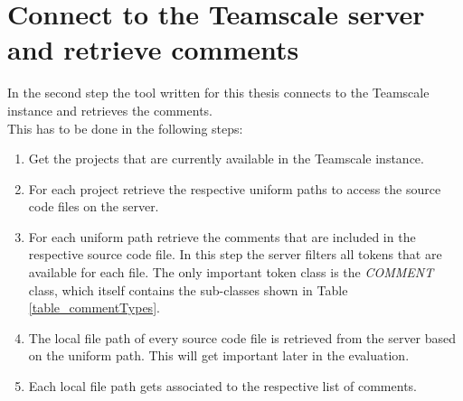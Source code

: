 \section{Connect to the Teamscale server and retrieve comments}
\label{chapter_retrieveComments}
In the second step the tool written for this thesis connects to the Teamscale instance and retrieves the comments.\\
This has to be done in the following steps:
\begin{enumerate}
	\item Get the projects that are currently available in the Teamscale instance. 
	\item For each project retrieve the respective uniform paths to access the source code files on the server.
	\item For each uniform path retrieve the comments that are included in the respective source code file. In this step the server filters all tokens that are available for each file. The only important token class is the \textit{COMMENT} class, which itself contains the sub-classes shown in Table \ref{table_commentTypes}.
	\item The local file path of every source code file is retrieved from the server based on the uniform path. This will get important later in the evaluation.
	\item Each local file path gets associated to the respective list of comments.
\end{enumerate}

 
